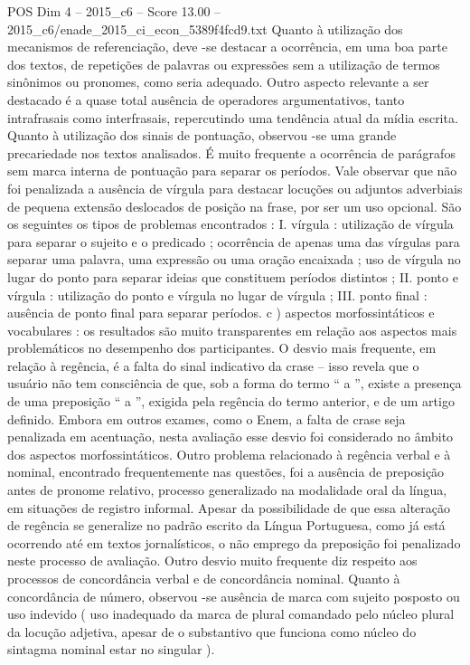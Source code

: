 \begin{textsample}{POS Dim 4 – 2015\_c6 – Score 13.00 – 2015\_c6/enade\_2015\_ci\_econ\_5389f4fcd9.txt}
Quanto à utilização dos mecanismos de referenciação, deve -se destacar a ocorrência, em uma boa parte dos textos, de repetições de palavras ou expressões sem a utilização de termos sinônimos ou pronomes, como seria adequado.
Outro aspecto relevante a ser destacado é a quase total ausência de operadores argumentativos, tanto intrafrasais como interfrasais, repercutindo uma tendência atual da mídia escrita.
Quanto à utilização dos sinais de pontuação, observou -se uma grande precariedade nos textos analisados.
É muito frequente a ocorrência de parágrafos sem marca interna de pontuação para separar os períodos.
Vale observar que não foi penalizada a ausência de vírgula para destacar locuções ou adjuntos adverbiais de pequena extensão deslocados de posição na frase, por ser um uso opcional.
São os seguintes os tipos de problemas encontrados : I. vírgula : utilização de vírgula para separar o sujeito e o predicado ; ocorrência de apenas uma das vírgulas para separar uma palavra, uma expressão ou uma oração encaixada ; uso de vírgula no lugar do ponto para separar ideias que constituem períodos distintos ; II. ponto e vírgula : utilização do ponto e vírgula no lugar de vírgula ; III. ponto final : ausência de ponto final para separar períodos. c ) aspectos morfossintáticos e vocabulares : os resultados são muito transparentes em relação aos aspectos mais problemáticos no desempenho dos participantes.
O desvio mais frequente, em relação à regência, é a falta do sinal indicativo da crase – isso revela que o usuário não tem consciência de que, sob a forma do termo “ a ”, existe a presença de uma preposição “ a ”, exigida pela regência do termo anterior, e de um artigo definido.
Embora em outros exames, como o Enem, a falta de crase seja penalizada em acentuação, nesta avaliação esse desvio foi considerado no âmbito dos aspectos morfossintáticos.
Outro problema relacionado à regência verbal e à nominal, encontrado frequentemente nas questões, foi a ausência de preposição antes de pronome relativo, processo generalizado na modalidade oral da língua, em situações de registro informal.
Apesar da possibilidade de que essa alteração de regência se generalize no padrão escrito da Língua Portuguesa, como já está ocorrendo até em textos jornalísticos, o não emprego da preposição foi penalizado neste processo de avaliação.
Outro desvio muito frequente diz respeito aos processos de concordância verbal e de concordância nominal.
Quanto à concordância de número, observou -se ausência de marca com sujeito posposto ou uso indevido ( uso inadequado da marca de plural comandado pelo núcleo plural da locução adjetiva, apesar de o substantivo que funciona como núcleo do sintagma nominal estar no singular ).

\end{textsample}
